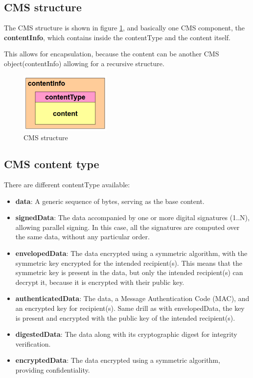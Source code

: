 \subsection{CMS structure}
The CMS structure is shown in figure \ref{fig:cms structure}, and
basically one CMS component, the \textbf{contentInfo}, which contains
inside the contentType and the content itself.

This allows for encapsulation, because the content can be another CMS 
object(contentInfo) allowing for a recursive structure. 

\begin{figure}[H]
  \centering
  \includegraphics[width=0.4\textwidth]{img/cms structure.png}
  \caption{CMS structure}
  \label{fig:cms structure}
\end{figure}

\subsection{CMS content type}

There are different contentType available:

\begin{itemize}
  \item \textbf{data}: A generic sequence of bytes, serving as the
    base content.
  \item \textbf{signedData}: The data accompanied by one or more
    digital signatures (1..N), allowing parallel signing. In this
    case, all the signatures are computed over the same data,
    without any particular order.
  \item \textbf{envelopedData}: The data encrypted using a symmetric
    algorithm, with the symmetric key encrypted for the intended
    recipient(s). This means that the symmetric key is present in
    the data, but only the intended recipient(s) can decrypt it,
    because it is encrypted with their public key.
  \item \textbf{authenticatedData}: The data, a Message
    Authentication Code (MAC), and an encrypted key for
    recipient(s). Same drill as with envelopedData, the key is
    present and encrypted with the public key of the intended 
    recipient(s).
  \item \textbf{digestedData}: The data along with its cryptographic
    digest for integrity verification.
  \item \textbf{encryptedData}: The data encrypted using a symmetric
    algorithm, providing confidentiality.
\end{itemize}

